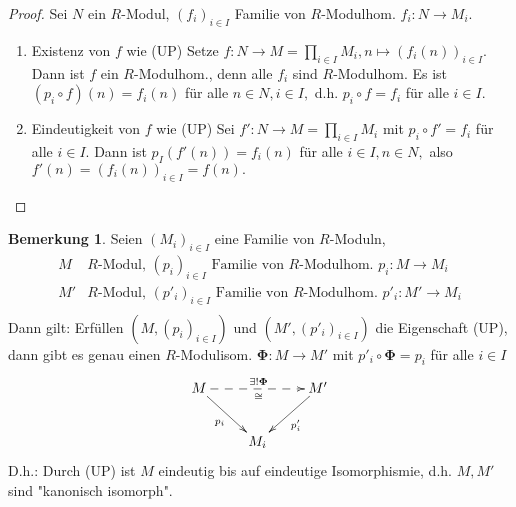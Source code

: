 \documentclass[a4paper, titlepage]{article}
\theoremstyle{definition}
\newtheorem{bem}[satz]{Bemerkung}
\begin{document}
        \begin{proof}
            Sei $N$ ein $R$-Modul, $(f_i)_{i\in I}$ Familie von $R$-Modulhom. $f_i:N\longrightarrow M_i.$
            \begin{enumerate}[1.]
                \item Existenz von $f$ wie (UP)\newline
                Setze $f:N\longrightarrow M=\prod\limits_{i\in I}M_i,n\longmapsto (f_i(n))_{i\in I}.$ Dann ist $f$ ein $R$-Modulhom., denn alle $f_i$ sind $R$-Modulhom. Es ist $(p_i\circ f)(n)=f_i(n)$ für alle $n\in N, i\in I,$ d.h. $p_i\circ f=f_i$ für alle $i\in I.$
                \item Eindeutigkeit von $f$ wie (UP)\newline
                Sei $f':N\longrightarrow M=\prod\limits_{i\in I}M_i$ mit $p_i\circ f'=f_i$ für alle $i\in I.$ Dann ist $p_I(f'(n))=f_i(n)$ für alle $i\in I,n\in N,$ also $f'(n)=(f_i(n))_{i\in I}=f(n).$
            \end{enumerate}
        \end{proof}
        \begin{bem}
            Seien $(M_i)_{i\in I}$ eine Familie von $R$-Moduln,
            \begin{align*}
                M& R\text{-Modul, }(p_i)_{i\in I}\text{ Familie von }R\text{-Modulhom. }p_i:M\longrightarrow M_i\\
                M'& R\text{-Modul, }(p'_i)_{i\in I}\text{ Familie von }R\text{-Modulhom. }p'_i:M'\longrightarrow M_i\\
            \end{align*}
            Dann gilt: \newline 
            Erfüllen $(M,(p_i)_{i\in I})$ und $(M',(p'_i)_{i\in I})$ die Eigenschaft (UP), dann gibt es genau einen $R$-Modulisom. $\boldsymbol{\Phi}:M\longrightarrow M'$ mit $p'_i\circ \boldsymbol{\Phi}=p_i$ für alle $i\in I$
            \[ 
                \begin{xy}
                    \xymatrix{
                    M \ar@{-->}[rr]_{\cong}^{\exists!\boldsymbol{\Phi}} \ar[dr]_{p_i} &&M'\ar[dl]^{p'_i}\\
                    &M_i&
                    }
                \end{xy}
                \]
            D.h.: Durch (UP) ist $M$ eindeutig bis auf eindeutige Isomorphismie, d.h. $M,M'$ sind "kanonisch isomorph".
        \end{bem}
\end{document}
